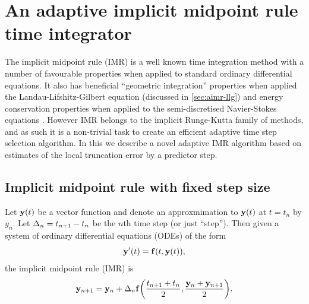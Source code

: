 







\chapter{An adaptive implicit midpoint rule time integrator}
\label{sec:adaptive-imr}


The implicit midpoint rule (IMR) is a well known time integration method with a number of favourable properties when applied to standard ordinary differential equations\cite[pg. 204]{HairerNorsettWanner}.
It also has beneficial ``geometric integration'' properties when applied the Landau-Lifshitz-Gilbert equation (discussed in \autoref{sec:aimr-llg}) and energy conservation properties when applied to the semi-discretised Navier-Stokes equations \cite{Sanderse2013}.
However IMR belongs to the implicit Runge-Kutta family of methods, and as such it is a non-trivial task to create an efficient adaptive time step selection algorithm.
In this \secpaper{} we describe a novel adaptive IMR algorithm based on estimates of the local truncation error by a predictor step.


\section{Implicit midpoint rule with fixed step size}
\label{sec:fixed-step-implicit}

Let $\mathbf{y}(t)$ be a vector function and denote an approxmimation to $\mathbf{y}(t)$ at $t = t_n$ by $y_n$.
Let $\Delta_{n} = t_{n+1} - t_n$ be the $n$th time step (or just ``step'').
Then given a system of ordinary differential equations (ODEs) of the form
\begin{equation}
  \mathbf{y}'(t) = {\mathbf{f}{\left( t, \mathbf{y}(t) \right)}},
  \label{eq:43}
\end{equation}
the implicit midpoint rule (IMR) is
\begin{equation}
    \mathbf{y}_{n+1} = \mathbf{y}_n + \Delta_{n} {\mathbf{f}{\left( \frac{t_{n+1} + t_n}{2}, \frac{\mathbf{y}_n + \mathbf{y}_{n+1}}{2} \right)}}.
\end{equation}

